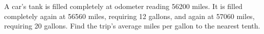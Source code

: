 A car's tank is filled completely at odometer reading 56200 miles. It is filled completely again at 56560 miles, requiring 12 gallons, and again at 57060 miles, requiring 20 gallons. Find the trip's average miles per gallon to the nearest tenth.
